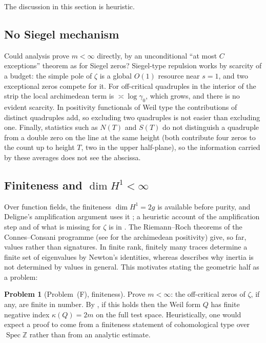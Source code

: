 \documentclass[11pt]{amsart}
\theoremstyle{definition}
\newtheorem{problem}[theorem]{Problem}
\theoremstyle{remark}
\newcommand{\bbZ}{\mathbb{Z}}
\DeclareMathOperator{\Spec}{Spec}
\begin{document}
The discussion in this section is heuristic.

\subsection{No Siegel mechanism}
Could analysis prove $m<\infty$ directly, by an unconditional ``at most $C$
exceptions'' theorem as for Siegel zeros? Siegel-type repulsion works by
scarcity of a budget: the simple pole of $\zeta$ is a global $O(1)$ resource
near $s=1$, and two exceptional zeros compete for it. For off-critical
quadruples in the interior of the strip the local archimedean term is
$\asymp\log\gamma_0$, which grows, and there is no evident scarcity. In
positivity functionals of Weil type the contributions of distinct quadruples
add, so excluding two quadruples is not easier than excluding one. Finally,
statistics such as $N(T)$ and $S(T)$ do not distinguish a quadruple from a
double zero on the line at the same height (both contribute four zeros to the
count up to height $T$, two in the upper half-plane), so the information
carried by these averages does not see the abscissa.

\subsection{\texorpdfstring{Finiteness and $\dim H^1<\infty$}{Finiteness and dim H1 finite}}
Over function fields, the finiteness $\dim H^1=2g$ is available before
purity, and Deligne's amplification argument uses it \cite{Del74}; a
heuristic account of the amplification step and of what is missing for
$\zeta$ is in \cite[\S7]{P27}. The Riemann--Roch theorems of the
Connes--Consani programme (see \cite{CC21} for the archimedean positivity)
give, so far, values rather than signatures. In finite rank, finitely many
traces determine a finite set of eigenvalues by Newton's identities, whereas
\cite[Heuristic~4.3]{P29} describes why inertia is not determined by values
in general. This motivates stating the geometric half as a problem:

\begin{problem}[Problem~(F), finiteness]\label{prob:L8}
Prove $m<\infty$: the off-critical zeros of $\zeta$, if any, are finite in
number. By \cite[Prop.~4.7]{P25}, if this holds then the
Weil form $Q$ has finite negative index $\kappa(Q)=2m$ on the full test
space. Heuristically, one would expect a proof to come from a finiteness
statement of cohomological type over $\Spec\bbZ$ rather than from an
analytic estimate.
\end{problem}
\end{document}
